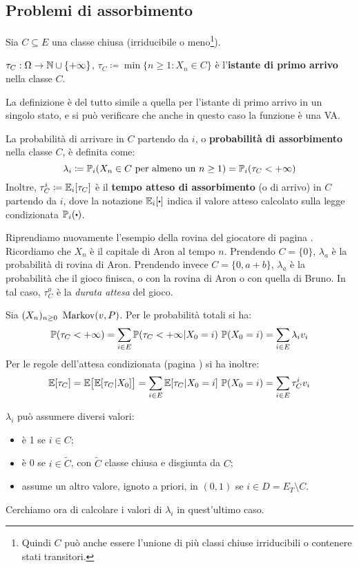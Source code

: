 \subsection{Problemi di assorbimento}
Sia $C \subseteq E$ una classe chiusa (irriducibile o meno\footnote{Quindi $C$ può anche essere l'unione di più classi chiuse irriducibili o contenere stati transitori.}).
\begin{defn}
	$\tau_C: \Omega \to \mathbb N \cup \{+\infty\}$, $\tau_C \coloneqq \min\{ n \ge 1 : X_n \in C \}$
	è l'\textbf{istante di primo arrivo} nella classe $C$.
\end{defn}
La definizione è del tutto simile a quella per l'istante di primo arrivo in un singolo stato, e si può verificare che anche in questo caso la funzione è una VA.
\begin{defn}
	La probabilità di arrivare in $C$ partendo da $i$, o \textbf{probabilità di assorbimento} nella classe $C$, è definita come:
	$$\lambda_i \coloneqq \mathbb P_i(X_n \in C \text{ per almeno un } n \ge 1) = \mathbb P_i(\tau_C < +\infty)$$
	Inoltre, $\tau_C^i \coloneqq \mathbb E_i[\tau_C]$ è il \textbf{tempo atteso di assorbimento} (o di arrivo) in $C$ partendo da $i$, dove la notazione $\EE_i[\bigcdot]$ indica il valore atteso calcolato sulla legge condizionata $\PP_i(\bigcdot)$.
\end{defn}
\begin{ese}
	Riprendiamo nuovamente l'esempio della rovina del giocatore di pagina \pageref{rovina-gioc}.
	Ricordiamo che $X_n$ è il capitale di Aron al tempo $n$.
	Prendendo $C = \{0\}$, $\lambda_a$ è la probabilità di rovina di Aron.
	Prendendo invece $C = \{0,a+b\}$, $\lambda_a$ è la probabilità che il gioco finisca, o con la rovina di Aron o con quella di Bruno.
	In tal caso, $\tau_C^a$ è la \emph{durata attesa} del gioco.
\end{ese}

\begin{nb}
	Sia $(X_n)_{n \ge 0} \ \markov(v,P)$.
	Per le probabilità totali si ha:
	$$ \mathbb P(\tau_C < +\infty) = \sum_{i \in E} \mathbb P(\tau_C < +\infty | X_0=i ) \ \mathbb P(X_0=i) = \sum_{i \in E} \lambda_i v_i$$
	Per le regole dell'attesa condizionata (pagina \pageref{formula-att-cond}) si ha inoltre:
	$$ \mathbb E[\tau_C] = \mathbb E\big[ \mathbb E[\tau_C | X_0] \big] =
	\sum_{i \in E} \mathbb E[\tau_C | X_0=i] \ \mathbb P(X_0=i) = \sum_{i \in E} \tau_C^i v_i
	$$
\end{nb}
\begin{nb}
	$\lambda_i$ può assumere diversi valori:
	\begin{itemize}
		\item è 1 se $i \in C$;
		\item è 0 se $i \in \widetilde C$, con $\widetilde C$ classe chiusa e disgiunta da $C$;
		\item assume un altro valore, ignoto a priori, in $(0,1)$ se $i \in D = E_T \setminus C$.
	\end{itemize}
\end{nb}
Cerchiamo ora di calcolare i valori di $\lambda_i$ in quest'ultimo caso.

